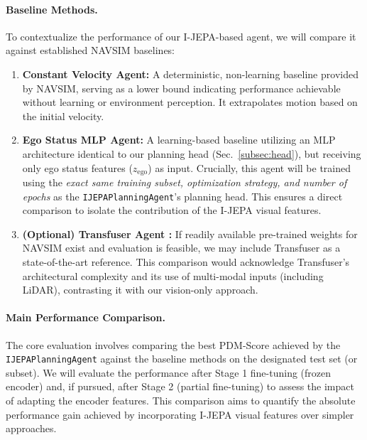 \documentclass{article}
\begin{document}
\paragraph{Baseline Methods.}
To contextualize the performance of our I-JEPA-based agent, we will compare it against established NAVSIM baselines:
\begin{enumerate}
    \item \textbf{Constant Velocity Agent:} A deterministic, non-learning baseline provided by NAVSIM, serving as a lower bound indicating performance achievable without learning or environment perception. It extrapolates motion based on the initial velocity.
    \item \textbf{Ego Status MLP Agent:} A learning-based baseline utilizing an MLP architecture identical to our planning head (Sec.~\ref{subsec:head}), but receiving only ego status features ($z_{\text{ego}}$) as input. Crucially, this agent will be trained using the \textit{exact same training subset, optimization strategy, and number of epochs} as the \texttt{IJEPAPlanningAgent}'s planning head. This ensures a direct comparison to isolate the contribution of the I-JEPA visual features.
    \item \textbf{(Optional) Transfuser Agent \cite{chitta2023transfuser}:} If readily available pre-trained weights for NAVSIM exist and evaluation is feasible, we may include Transfuser as a state-of-the-art reference. This comparison would acknowledge Transfuser's architectural complexity and its use of multi-modal inputs (including LiDAR), contrasting it with our vision-only approach.
\end{enumerate}

\paragraph{Main Performance Comparison.}
The core evaluation involves comparing the best PDM-Score achieved by the \texttt{IJEPAPlanningAgent} against the baseline methods on the designated test set (or subset). We will evaluate the performance after Stage 1 fine-tuning (frozen encoder) and, if pursued, after Stage 2 (partial fine-tuning) to assess the impact of adapting the encoder features. This comparison aims to quantify the absolute performance gain achieved by incorporating I-JEPA visual features over simpler approaches.
\end{document}
